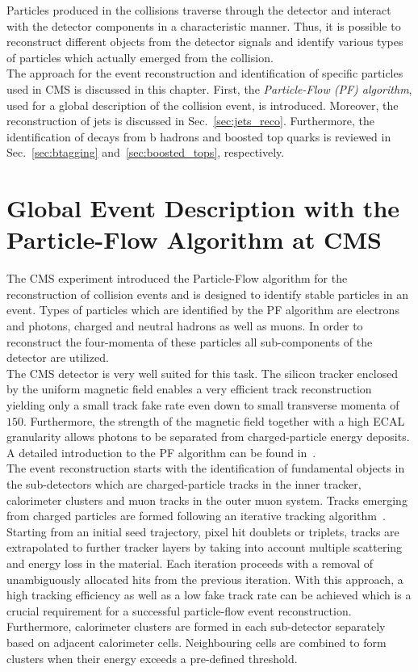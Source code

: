 Particles produced in the \pp collisions traverse through the detector and interact with the detector components in a characteristic manner. Thus, it is possible to reconstruct different objects from the detector signals and identify various types of particles which actually emerged from the collision. \\
The approach for the event reconstruction and identification of specific particles used in CMS is discussed in this chapter. First, the \textit{Particle-Flow (PF) algorithm}, used for a global description of the collision event, is introduced. Moreover, the reconstruction of jets is discussed in Sec.~\ref{sec:jets_reco}. Furthermore, the identification of decays from b hadrons and boosted top quarks is reviewed in Sec.~\ref{sec:btagging} and~\ref{sec:boosted_tops}, respectively.
\section{Global Event Description with the Particle-Flow Algorithm at CMS}
\label{sec:pf_algo}
The CMS experiment introduced the Particle-Flow algorithm for the reconstruction of collision events and is designed to identify stable particles in an event. Types of particles which are identified by the PF algorithm are electrons and photons, charged and neutral hadrons as well as muons. In order to reconstruct the four-momenta of these particles all sub-components of the detector are utilized. \\
The CMS detector is very well suited for this task. The silicon tracker enclosed by the uniform magnetic field enables a very efficient track reconstruction yielding only a small track fake rate even down to small transverse momenta of $150$\mev. Furthermore, the strength of the magnetic field together with a high ECAL granularity allows photons to be separated from charged-particle energy deposits. A detailed introduction to the PF algorithm can be found in~\cite{CMS-PAS-PFT-09-001}. \\ 
The event reconstruction starts with the identification of fundamental objects in the sub-detectors which are charged-particle tracks in the inner tracker, calorimeter clusters and muon tracks in the outer muon system. Tracks emerging from charged particles are formed following an iterative tracking algorithm~\cite{Adam:934067}. Starting from an initial seed trajectory, \eg pixel hit doublets or triplets, tracks are extrapolated to further tracker layers by taking into account multiple scattering and energy loss in the material. Each iteration proceeds with a removal of unambiguously allocated hits from the previous iteration. With this approach, a high tracking efficiency as well as a low fake track rate can be achieved which is a crucial requirement for a successful particle-flow event reconstruction. Furthermore, calorimeter clusters are formed in each sub-detector separately based on adjacent calorimeter cells. Neighbouring cells are combined to form clusters when their energy exceeds a pre-defined threshold. \\
